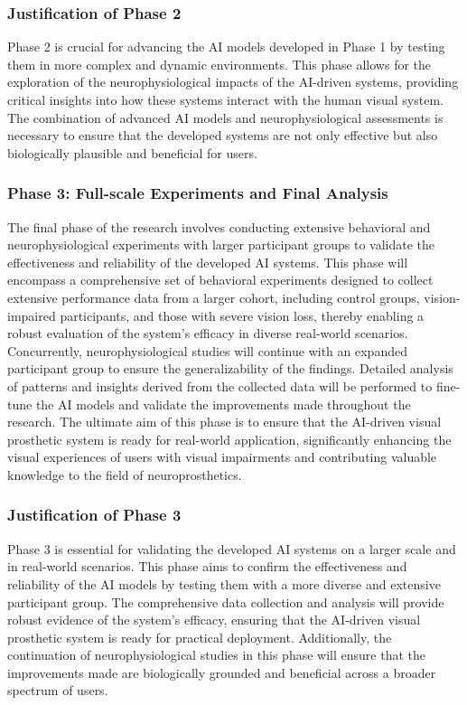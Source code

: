 \documentclass[10pt]{article}
\begin{document}
\subsubsection*{Justification of Phase 2}
Phase 2 is crucial for advancing the AI models developed in Phase 1 by testing
them in more complex and dynamic environments. This phase allows for the
exploration of the neurophysiological impacts of the AI-driven systems,
providing critical insights into how these systems interact with the human
visual system. The combination of advanced AI models and neurophysiological
assessments is necessary to ensure that the developed systems are not only
effective but also biologically plausible and beneficial for users.

\subsubsection*{Phase 3: Full-scale Experiments and Final Analysis}
The final phase of the research involves conducting extensive behavioral and
neurophysiological experiments with larger participant groups to validate the
effectiveness and reliability of the developed AI systems. This phase will
encompass a comprehensive set of behavioral experiments designed to collect
extensive performance data from a larger cohort, including control groups,
vision-impaired participants, and those with severe vision loss, thereby
enabling a robust evaluation of the system's efficacy in diverse real-world
scenarios. Concurrently, neurophysiological studies will continue with an
expanded participant group to ensure the generalizability of the findings.
Detailed analysis of patterns and insights derived from the collected data will
be performed to fine-tune the AI models and validate the improvements made
throughout the research. The ultimate aim of this phase is to ensure that the
AI-driven visual prosthetic system is ready for real-world application,
significantly enhancing the visual experiences of users with visual impairments
and contributing valuable knowledge to the field of neuroprosthetics.

\subsubsection*{Justification of Phase 3}
Phase 3 is essential for validating the developed AI systems on a larger scale
and in real-world scenarios. This phase aims to confirm the effectiveness and
reliability of the AI models by testing them with a more diverse and extensive
participant group. The comprehensive data collection and analysis will provide
robust evidence of the system's efficacy, ensuring that the AI-driven visual
prosthetic system is ready for practical deployment. Additionally, the
continuation of neurophysiological studies in this phase will ensure that the
improvements made are biologically grounded and beneficial across a broader
spectrum of users.
\end{document}
